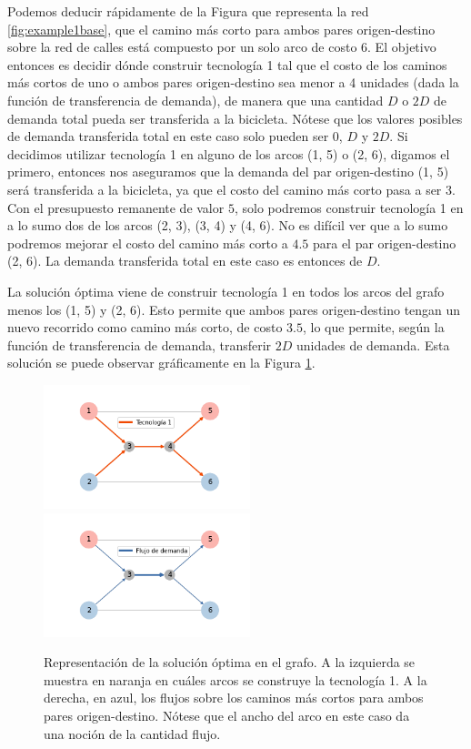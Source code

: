 Podemos deducir rápidamente de la Figura que representa la red \ref{fig:example1base}, que el camino más corto para ambos pares origen-destino sobre la red de calles está compuesto por un solo arco de costo 6. El objetivo entonces es decidir dónde construir tecnología 1 tal que el costo de los caminos más cortos de uno o ambos pares origen-destino sea menor a 4 unidades (dada la función de transferencia de demanda), de manera que una cantidad $D$ o $2D$ de demanda total pueda ser transferida a la bicicleta. Nótese que los valores posibles de demanda transferida total en este caso solo pueden ser $0$, $D$ y $2D$. Si decidimos utilizar tecnología 1 en alguno de los arcos (1, 5) o (2, 6), digamos el primero, entonces nos aseguramos que la demanda del par origen-destino (1, 5) será transferida a la bicicleta, ya que el costo del camino más corto pasa a ser $3$. Con el presupuesto remanente de valor $5$, solo podremos construir tecnología 1 en a lo sumo dos de los arcos (2, 3), (3, 4) y (4, 6). No es difícil ver que a lo sumo podremos mejorar el costo del camino más corto a $4.5$ para el par origen-destino (2, 6). La demanda transferida total en este caso es entonces de $D$.

La solución óptima viene de construir tecnología 1 en todos los arcos del grafo menos los (1, 5) y (2, 6). Esto permite que ambos pares origen-destino tengan un nuevo recorrido como camino más corto, de costo $3.5$, lo que permite, según la función de transferencia de demanda, transferir $2D$ unidades de demanda. Esta solución se puede observar gráficamente en la Figura \ref{fig:example1solution}.

\begin{figure}[h!]
  \centering
  \includegraphics[width=6cm]{../resources/example_1_infras.png}
  \includegraphics[width=6cm]{../resources/example_1_flows.png}
  \caption{Representación de la solución óptima en el grafo. A la izquierda se muestra en naranja en cuáles arcos se construye la tecnología 1. A la derecha, en azul, los flujos sobre los caminos más cortos para ambos pares origen-destino. Nótese que el ancho del arco en este caso da una noción de la cantidad flujo.}
  \label{fig:example1solution}
\end{figure}

